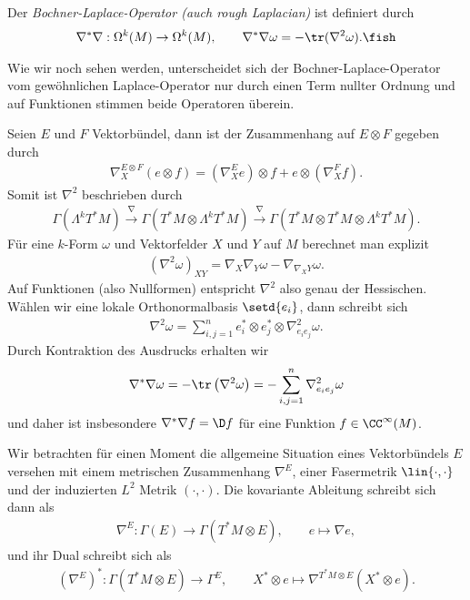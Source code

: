 \documentclass[%
	paper=a5,%
	fleqn,%
	DIV=18,%
	BCOR=0mm,
	fontsize=11pt,
	titlepage=false,%
	bibliography=totoc,
	DIV=18,%
	twoside=true,
	pdftitle=Riemannsche Geometrie,
	pdfauthor=Uwe Semmelmann,
	numbers=noendperiod]%
	{scrbook}
\begin{document}
\begin{defn}
Der \emph{Bochner-Laplace-Operator (auch rough Laplacian)} ist definiert durch
\begin{align*}
\nabla^*\nabla : \Omega^k(M)\to \Omega^k(M),\qquad \nabla^*\nabla\omega = - \tr(\nabla^2\omega).\fish
\end{align*}
\end{defn}

Wie wir noch sehen werden, unterscheidet sich der Bochner-Laplace-Operator vom gewöhnlichen Laplace-Operator nur durch einen Term nullter Ordnung und auf Funktionen stimmen beide Operatoren überein.

\begin{rem}
Seien $E$ und $F$ Vektorbündel, dann ist der Zusammenhang auf $E\otimes F$ gegeben durch
\begin{align*}
\nabla_{X}^{E\otimes F} (e\otimes f) = (\nabla_{X}^E e)\otimes f + e\otimes (\nabla_{X}^F f).
\end{align*}
Somit ist $\nabla^2$ beschrieben durch
\begin{align*}
\Gamma(\Lambda^k T^*M) \overset{\nabla}{\longrightarrow}
\Gamma(T^*M\otimes\Lambda^k T^*M) \overset{\nabla}{\longrightarrow}
\Gamma(T^*M\otimes T^*M\otimes\Lambda^k T^*M).
\end{align*}
Für eine $k$-Form $\omega$ und Vektorfelder $X$ und $Y$ auf $M$ berechnet man explizit
\begin{align*}
(\nabla^2\omega)_{XY} = \nabla_{X}\nabla_{Y}\omega - \nabla_{\nabla_{X}Y}\omega.
\end{align*}
Auf Funktionen (also Nullformen) entspricht $\nabla^2$ also genau der Hessischen. Wählen wir eine lokale Orthonormalbasis $\setd{e_{i}}$, dann schreibt sich
\begin{align*}
\nabla^2 \omega = \sum_{i,j=1}^n e_{i}^* \otimes e_{j}^*\otimes \nabla_{e_{i}e_{j}}^2 \omega.
\end{align*}
Durch Kontraktion des Ausdrucks erhalten wir
\begin{align*}
\nabla^*\nabla \omega = - \tr\left(\nabla^2\omega\right) =  -\sum_{i,j=1}^n \nabla_{e_{i}e_{j}}^2\omega
\end{align*}
und daher ist insbesondere $\nabla^*\nabla f = \D f$ für eine Funktion $f\in\CC^\infty(M)$.\map
\end{rem}

Wir betrachten für einen Moment die allgemeine Situation eines Vektorbündels $E$ versehen mit einem metrischen Zusammenhang $\nabla^E$, einer Fasermetrik $\lin{\cdot,\cdot}$ und der induzierten $L^2$ Metrik $(\cdot,\cdot)$. Die kovariante Ableitung schreibt sich dann als
\begin{align*}
\nabla^E : \Gamma(E)\to \Gamma(T^*M\otimes E),\qquad e\mapsto \nabla e,
\end{align*}
und ihr Dual schreibt sich als
\begin{align*}
(\nabla^E)^* : \Gamma(T^*M\otimes E)\to \Gamma^E,\qquad X^*\otimes e\mapsto \nabla^{T^*M\otimes E} (X^*\otimes e).
\end{align*}
\end{document}
